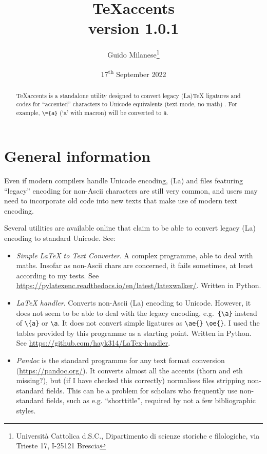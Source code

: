 \documentclass[
  12pt,
  english,
]{article}
\title{TeXaccents\\
version 1.0.1}
\author{Guido Milanese\footnote{Università Cattolica d.S.C.,
  Dipartimento di scienze storiche e filologiche, via Trieste 17,
  I-25121 Brescia}}
\date{17\textsuperscript{th} September 2022}
\begin{document}
\maketitle
\begin{abstract}
TeXaccents is a standalone utility designed to convert legacy (La)TeX
ligatures and codes for ``accented'' characters to Unicode equivalents
(text mode, no math) . For example, \texttt{\textbackslash{}=\{a\}} (`a'
with macron) will be converted to \texttt{ā}.
\end{abstract}

\hypertarget{general-information}{%
\section{General information}\label{general-information}}

Even if modern compilers handle Unicode encoding, (La) and files
featuring ``legacy'' encoding for non-Ascii characters are still very
common, and users may need to incorporate old code into new texts that
make use of modern text encoding.

Several utilities are available online that claim to be able to convert
legacy (La) encoding to standard Unicode. See:

\begin{itemize}
\item
  \emph{Simple LaTeX to Text Converter}. A complex programme, able to
  deal with maths. Insofar as non-Ascii chars are concerned, it fails
  sometimes, at least according to my tests. See
  \url{https://pylatexenc.readthedocs.io/en/latest/latexwalker/}.
  Written in Python.
\item
  \emph{LaTeX handler}. Converts non-Ascii (La) encoding to Unicode.
  However, it does not seem to be able to deal with the legacy encoding,
  e.g.~\texttt{\{\textbackslash{}a\}} instead of
  \texttt{\textbackslash{}\{a\}} or \texttt{\textbackslash{}a}. It does
  not convert simple ligatures as \texttt{\textbackslash{}ae\{\}}
  \texttt{\textbackslash{}oe\{\}}. I used the tables provided by this
  programme as a starting point. Written in Python. See
  \url{https://github.com/hayk314/LaTex-handler}.
\item
  \emph{Pandoc} is the standard programme for any text format conversion
  (\url{https://pandoc.org/}). It converts almost all the accents (thorn
  and eth missing?), but (if I have checked this correctly) normalises
  files stripping non-standard fields. This can be a problem for
  scholars who frequently use non-standard fields, such as e.g.
  ``shorttitle'', required by not a few bibliographic styles.
\end{itemize}
\end{document}
